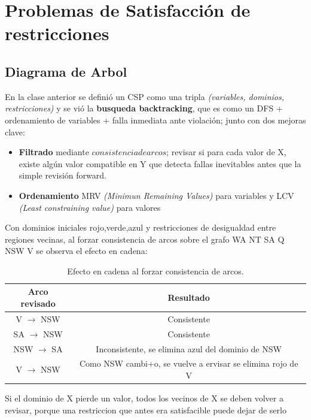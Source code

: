 \section{Problemas de Satisfacción de restricciones}

\subsection{Diagrama de Arbol}

En la clase anterior se definió un CSP como una tripla \textit{(variables, dominios, restricciones)} y se vió la \textbf{busqueda backtracking}, que es como un DFS + ordenamiento de variables + falla inmediata ante violación;
junto con dos mejoras clave:

\begin{itemize}
    \item \textbf{Filtrado} mediante $consistencia de arcos$; revisar si para cada valor de X, existe algún valor compatible en Y que detecta fallas inevitables antes que la simple revisión forward.
    \item \textbf{Ordenamiento} MRV \textit{(Minimun Remaining Values)} para variables y LCV \textit{(Least constraining value)} para valores 
\end{itemize}


\begin{example}
    Con dominios iniciales {rojo,verde,azul} y restricciones de desigualdad entre regiones vecinas, al forzar consistencia de arcos
    sobre el grafo WA NT SA Q NSW V se observa el efecto en cadena:
    \begin{table}[h!]
        \centering
        \begin{tabular}{|c|c|}
            \hline
            Arco revisado & Resultado \\ \hline
            V $\rightarrow$ NSW & Consistente \\ \hline
            SA $\rightarrow$ NSW & Consistente \\ \hline
            NSW $\rightarrow$ SA & Inconsistente, se elimina azul del dominio de NSW \\ \hline
            V $\rightarrow$ NSW & Como NSW cambi+o, se vuelve a ervisar se elimina rojo de V \\ \hline
        \end{tabular}
        \caption{Efecto en cadena al forzar consistencia de arcos.}
        \label{tab:consistencia_arcos}
    \end{table}
    Si el dominio de X pierde un valor, todos los vecinos de X se deben volver a revisar, porque una restriccion que antes era
    satisfacible puede dejar de serlo
\end{example}

